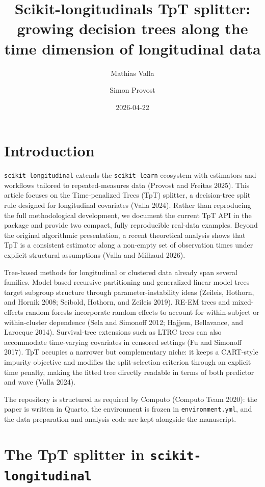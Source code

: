 \documentclass[
]{article}
\title{Scikit-longitudinals TpT splitter: growing decision trees along
the time dimension of longitudinal data}
\author{Mathias Valla \and Simon Provost}
\date{2026-04-22}
\begin{document}
\maketitle

\section{Introduction}\label{introduction}

\texttt{scikit-longitudinal} extends the \texttt{scikit-learn} ecosystem
with estimators and workflows tailored to repeated-measures data
(Provost and Freitas 2025). This article focuses on the Time-penalized
Trees (TpT) splitter, a decision-tree split rule designed for
longitudinal covariates (Valla 2024). Rather than reproducing the full
methodological development, we document the current TpT API in the
package and provide two compact, fully reproducible real-data examples.
Beyond the original algorithmic presentation, a recent theoretical
analysis shows that TpT is a consistent estimator along a non-empty set
of observation times under explicit structural assumptions (Valla and
Milhaud 2026).

Tree-based methods for longitudinal or clustered data already span
several families. Model-based recursive partitioning and generalized
linear model trees target subgroup structure through
parameter-instability ideas (Zeileis, Hothorn, and Hornik 2008; Seibold,
Hothorn, and Zeileis 2019). RE-EM trees and mixed-effects random forests
incorporate random effects to account for within-subject or
within-cluster dependence (Sela and Simonoff 2012; Hajjem, Bellavance,
and Larocque 2014). Survival-tree extensions such as LTRC trees can also
accommodate time-varying covariates in censored settings (Fu and
Simonoff 2017). TpT occupies a narrower but complementary niche: it
keeps a CART-style impurity objective and modifies the split-selection
criterion through an explicit time penalty, making the fitted tree
directly readable in terms of both predictor and wave (Valla 2024).

The repository is structured as required by Computo (Computo Team 2020):
the paper is written in Quarto, the environment is frozen in
\texttt{environment.yml}, and the data preparation and analysis code are
kept alongside the manuscript.

\section{\texorpdfstring{The TpT splitter in
\texttt{scikit-longitudinal}}{The TpT splitter in scikit-longitudinal}}\label{the-tpt-splitter-in-scikit-longitudinal}
\end{document}
